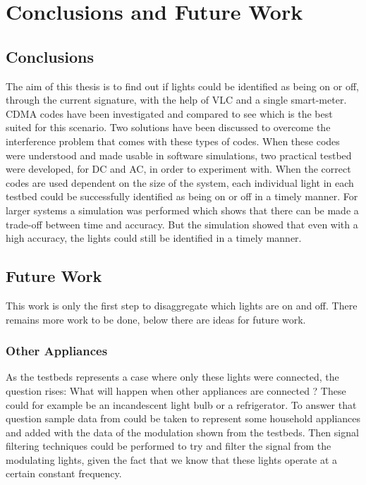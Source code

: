 
\chapter{Conclusions and Future Work}
\label{chp:conclusionsandfuturework}

\section{Conclusions}


The aim of this thesis is to find out if lights could be identified as being on or off, through the current signature, with the help of VLC and a single smart-meter.
CDMA codes have been investigated and compared to see which is the best suited for this scenario.
Two solutions have been discussed to overcome the interference problem that comes with these types of codes.
When these codes were understood and made usable in software simulations, two practical testbed were developed, for DC and AC, in order to experiment with.
When the correct codes are used dependent on the size of the system, each individual light in each testbed could be successfully identified as being on or off in a timely manner.
For larger systems a simulation was performed which shows that there can be made a trade-off between time and accuracy. 
But the simulation showed that even with a high accuracy, the lights could still be identified in a timely manner.






\section{Future Work}


This work is only the first step to disaggregate which lights are on and off.
There remains more work to be done, below there are ideas for future work.


\subsection{Other Appliances}

As the testbeds represents a case where only these lights were connected, the question rises: What will happen when other appliances are connected ?
These could for example be an incandescent light bulb or a refrigerator.
To answer that question sample data from \cite{kolter2011redd} could be taken to represent some household appliances and added with the data of the modulation shown from the testbeds.
Then signal filtering techniques could be performed to try and filter the signal from the modulating lights, given the fact that we know that these lights operate at a certain constant frequency.


